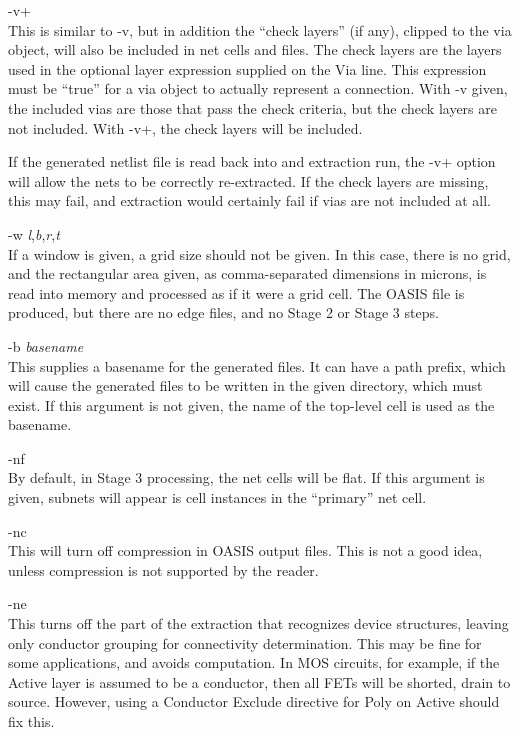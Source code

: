 \begin{description}
\item{\vt -v+}\\
This is similar to {\vt -v}, but in addition the ``check layers'' (if
any), clipped to the via object, will also be included in net cells
and files.  The check layers are the layers used in the optional layer
expression supplied on the {\vt Via} line.  This expression must be
``true'' for a via object to actually represent a connection.  With
{\vt -v} given, the included vias are those that pass the check
criteria, but the check layers are not included.  With {\vt -v+}, the
check layers will be included.

If the generated netlist file is read back into {\Xic} and extraction
run, the {\vt -v+} option will allow the nets to be correctly
re-extracted.  If the check layers are missing, this may fail, and
extraction would certainly fail if vias are not included at all.

\item{\vt -w} {\it l\/},{\it b\/},{\it r\/},{\it t}\\
If a window is given, a grid size should not be given.  In this case,
there is no grid, and the rectangular area given, as comma-separated
dimensions in microns, is read into memory and processed as if it were
a grid cell.  The OASIS file is produced, but there are no edge files,
and no Stage 2 or Stage 3 steps.

\item{\vt -b} {\it basename}\\
This supplies a basename for the generated files.  It can have a path
prefix, which will cause the generated files to be written in the
given directory, which must exist.  If this argument is not given, the
name of the top-level cell is used as the basename.

\item{\vt -nf}\\
By default, in Stage 3 processing, the net cells will be flat.  If
this argument is given, subnets will appear is cell instances in the
``primary'' net cell.

\item{\vt -nc}\\
This will turn off compression in OASIS output files.  This is not a
good idea, unless compression is not supported by the reader.

\item{\vt -ne}\\
This turns off the part of the extraction that recognizes device
structures, leaving only conductor grouping for connectivity
determination.  This may be fine for some applications, and avoids
computation.  In MOS circuits, for example, if the Active layer is
assumed to be a conductor, then all FETs will be shorted, drain to
source.  However, using a {\et Conductor Exclude} directive for Poly
on Active should fix this.


\end{description}
